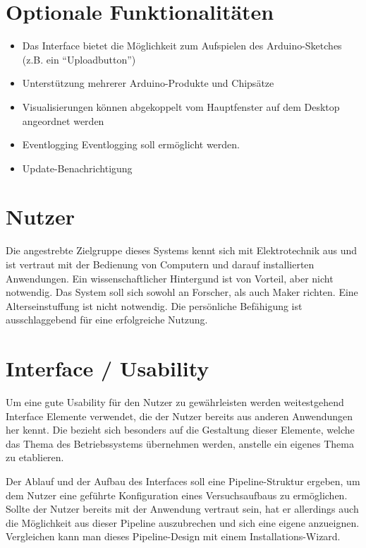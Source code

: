 \section{Optionale Funktionalitäten}
\begin{itemize}
 \item Das Interface bietet die Möglichkeit zum Aufspielen des Arduino-Sketches (z.B. ein ``Uploadbutton'')
 \item Unterstützung mehrerer Arduino-Produkte und Chipsätze
 \item Visualisierungen können abgekoppelt vom Hauptfenster auf dem Desktop angeordnet werden
 \item Eventlogging \gls{Eventlogging} soll ermöglicht werden.
 \item Update-Benachrichtigung
\end{itemize}

\section{Nutzer}
Die angestrebte Zielgruppe dieses Systems kennt sich mit Elektrotechnik aus und ist vertraut mit der Bedienung von Computern und darauf installierten Anwendungen. Ein wissenschaftlicher Hintergund ist von Vorteil, aber nicht notwendig. Das System soll sich sowohl an Forscher, als auch \gls{Maker} richten.
Eine Alterseinstuffung ist nicht notwendig. Die persönliche Befähigung ist ausschlaggebend für eine erfolgreiche Nutzung.

\section{Interface / Usability}
Um eine gute Usability für den Nutzer zu gewährleisten werden weitestgehend Interface Elemente verwendet, die der Nutzer bereits aus anderen Anwendungen her kennt. Die bezieht sich besonders auf die Gestaltung dieser Elemente, welche das Thema des Betriebssystems übernehmen werden, anstelle ein eigenes Thema zu etablieren.

Der Ablauf und der Aufbau des Interfaces soll eine Pipeline-Struktur ergeben, um dem Nutzer eine geführte Konfiguration eines Versuchsaufbaus zu ermöglichen. Sollte der Nutzer bereits mit der Anwendung vertraut sein, hat er allerdings auch die Möglichkeit aus dieser Pipeline auszubrechen und sich eine eigene anzueignen. Vergleichen kann man dieses Pipeline-Design mit einem Installations-Wizard.

